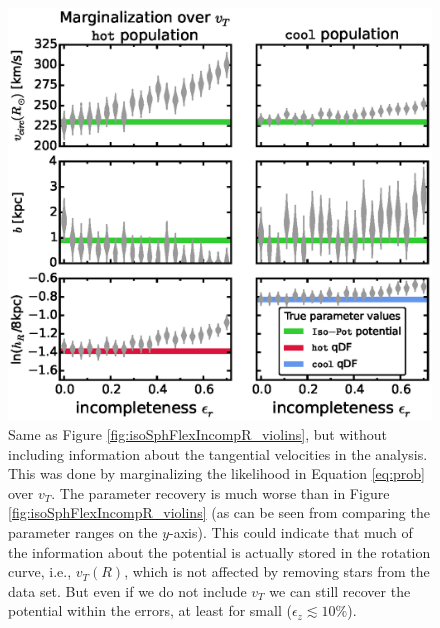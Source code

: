 \begin{figure}[!htbp]
\centering
\includegraphics[width=\columnwidth]{figs/isoSphFlexIncompR_marginal_violins_3.eps}
\caption{Same as Figure \ref{fig:isoSphFlexIncompR_violins}, but without including information about the tangential velocities in the analysis. This was done by marginalizing the likelihood in Equation \ref{eq:prob} over $v_T$. The parameter recovery is much worse than in Figure \ref{fig:isoSphFlexIncompR_violins} (as can be seen from comparing the parameter ranges on the $y$-axis). This could indicate that much of the information about the potential is actually stored in the rotation curve, i.e., $v_T(R)$, which is not affected by removing stars from the data set. But even if we do not include $v_T$ we can still recover the potential within the errors, at least for small ($\epsilon_z \lesssim 10\%$). } 
\label{fig:isoSphFlexIncompR_marginal_violins}
\end{figure}

